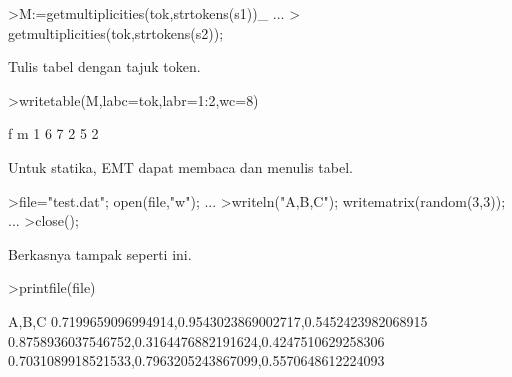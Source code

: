 \documentclass[a4paper,10pt]{article}
\begin{document}
\begin{eulernotebook}
\begin{eulercomment}
\begin{eulercomment}
\begin{eulercomment}
\begin{eulercomment}
\begin{eulercomment}
\begin{eulercomment}
\begin{eulercomment}
\begin{eulercomment}
\begin{eulercomment}
\begin{eulercomment}
\begin{eulercomment}
\begin{eulercomment}
\begin{eulercomment}
\begin{eulercomment}
\begin{eulercomment}
\begin{eulercomment}
\begin{eulercomment}
\begin{eulercomment}
\begin{eulercomment}
\begin{eulercomment}
\begin{eulercomment}
\begin{eulercomment}
\begin{eulercomment}
\begin{eulercomment}
\begin{eulercomment}
\begin{eulercomment}
\begin{eulercomment}
\begin{eulercomment}
\begin{eulercomment}
\begin{eulercomment}
\begin{eulercomment}
\begin{eulercomment}
\begin{eulercomment}
\begin{eulercomment}
\begin{eulercomment}
\begin{eulercomment}
\begin{eulercomment}
\end{eulercomment}
\begin{eulerprompt}
>M:=getmultiplicities(tok,strtokens(s1))_ ...
>  getmultiplicities(tok,strtokens(s2));
\end{eulerprompt}
\begin{eulercomment}
Tulis tabel dengan tajuk token.
\end{eulercomment}
\begin{eulerprompt}
>writetable(M,labc=tok,labr=1:2,wc=8)
\end{eulerprompt}
\begin{euleroutput}
                 f       m
         1       6       7
         2       5       2
\end{euleroutput}
\begin{eulercomment}
Untuk statika, EMT dapat membaca dan menulis tabel.
\end{eulercomment}
\begin{eulerprompt}
>file="test.dat"; open(file,"w"); ...
>writeln("A,B,C"); writematrix(random(3,3)); ...
>close();
\end{eulerprompt}
\begin{eulercomment}
Berkasnya tampak seperti ini.
\end{eulercomment}
\begin{eulerprompt}
>printfile(file)
\end{eulerprompt}
\begin{euleroutput}
  A,B,C
  0.7199659096994914,0.9543023869002717,0.5452423982068915
  0.8758936037546752,0.3164476882191624,0.4247510629258306
  0.7031089918521533,0.7963205243867099,0.5570648612224093
  

\end{euleroutput}
\end{eulercomment}
\end{eulercomment}
\end{eulercomment}
\end{eulercomment}
\end{eulercomment}
\end{eulercomment}
\end{eulercomment}
\end{eulercomment}
\end{eulercomment}
\end{eulercomment}
\end{eulercomment}
\end{eulercomment}
\end{eulercomment}
\end{eulercomment}
\end{eulercomment}
\end{eulercomment}
\end{eulercomment}
\end{eulercomment}
\end{eulercomment}
\end{eulercomment}
\end{eulercomment}
\end{eulercomment}
\end{eulercomment}
\end{eulercomment}
\end{eulercomment}
\end{eulercomment}
\end{eulercomment}
\end{eulercomment}
\end{eulercomment}
\end{eulercomment}
\end{eulercomment}
\end{eulercomment}
\end{eulercomment}
\end{eulercomment}
\end{eulercomment}
\end{eulercomment}
\end{eulernotebook}
\end{document}
